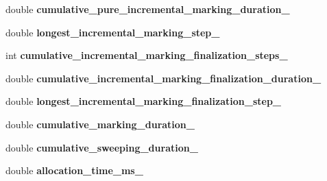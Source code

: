 \begin{DoxyCompactItemize}
\item 
double {\bfseries cumulative\+\_\+pure\+\_\+incremental\+\_\+marking\+\_\+duration\+\_\+}\hypertarget{classv8_1_1internal_1_1_g_c_tracer_a6e91a35d4ec59ccd60982ba3d3176175}{}\label{classv8_1_1internal_1_1_g_c_tracer_a6e91a35d4ec59ccd60982ba3d3176175}

\item 
double {\bfseries longest\+\_\+incremental\+\_\+marking\+\_\+step\+\_\+}\hypertarget{classv8_1_1internal_1_1_g_c_tracer_a1106eb374b1fc01459b6c4f9f7222545}{}\label{classv8_1_1internal_1_1_g_c_tracer_a1106eb374b1fc01459b6c4f9f7222545}

\item 
int {\bfseries cumulative\+\_\+incremental\+\_\+marking\+\_\+finalization\+\_\+steps\+\_\+}\hypertarget{classv8_1_1internal_1_1_g_c_tracer_a1765e62dda10b897aaa52b0eae8d7335}{}\label{classv8_1_1internal_1_1_g_c_tracer_a1765e62dda10b897aaa52b0eae8d7335}

\item 
double {\bfseries cumulative\+\_\+incremental\+\_\+marking\+\_\+finalization\+\_\+duration\+\_\+}\hypertarget{classv8_1_1internal_1_1_g_c_tracer_a9d9640849f99cdf816803978593d26b8}{}\label{classv8_1_1internal_1_1_g_c_tracer_a9d9640849f99cdf816803978593d26b8}

\item 
double {\bfseries longest\+\_\+incremental\+\_\+marking\+\_\+finalization\+\_\+step\+\_\+}\hypertarget{classv8_1_1internal_1_1_g_c_tracer_a3a5d32c5da6773df4aad38e56afdd8ce}{}\label{classv8_1_1internal_1_1_g_c_tracer_a3a5d32c5da6773df4aad38e56afdd8ce}

\item 
double {\bfseries cumulative\+\_\+marking\+\_\+duration\+\_\+}\hypertarget{classv8_1_1internal_1_1_g_c_tracer_afdd965d10d1aa59cb91e00396839cf23}{}\label{classv8_1_1internal_1_1_g_c_tracer_afdd965d10d1aa59cb91e00396839cf23}

\item 
double {\bfseries cumulative\+\_\+sweeping\+\_\+duration\+\_\+}\hypertarget{classv8_1_1internal_1_1_g_c_tracer_ac2698c63658653df1a8c70f4725fb3c5}{}\label{classv8_1_1internal_1_1_g_c_tracer_ac2698c63658653df1a8c70f4725fb3c5}

\item 
double {\bfseries allocation\+\_\+time\+\_\+ms\+\_\+}\hypertarget{classv8_1_1internal_1_1_g_c_tracer_a1de9a69e707c5f294e0316e7c9a4980c}{}\label{classv8_1_1internal_1_1_g_c_tracer_a1de9a69e707c5f294e0316e7c9a4980c}


\end{DoxyCompactItemize}
